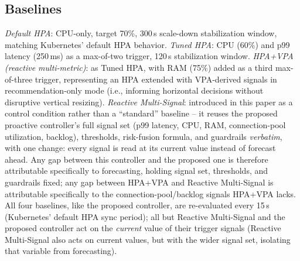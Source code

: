 \documentclass[conference]{IEEEtran}
\begin{document}
\subsection{Baselines}
\emph{Default HPA}: CPU-only, target 70\%, 300\,s scale-down stabilization window, matching Kubernetes'
default HPA behavior. \emph{Tuned HPA}: CPU (60\%) and p99 latency (250\,ms) as a max-of-two trigger,
120\,s stabilization window. \emph{HPA+VPA (reactive multi-metric)}: as Tuned HPA, with RAM (75\%)
added as a third max-of-three trigger, representing an HPA extended with VPA-derived signals in
recommendation-only mode (i.e., informing horizontal decisions without disruptive vertical resizing).
\emph{Reactive Multi-Signal}: introduced in this paper as a control condition rather than a
``standard'' baseline -- it reuses the proposed proactive controller's full signal set (p99 latency,
CPU, RAM, connection-pool utilization, backlog), thresholds, risk-fusion formula, and guardrails
\emph{verbatim}, with one change: every signal is read at its current value instead of forecast ahead.
Any gap between this controller and the proposed one is therefore attributable specifically to
forecasting, holding signal set, thresholds, and guardrails fixed; any gap between HPA+VPA and Reactive
Multi-Signal is attributable specifically to the connection-pool/backlog signals HPA+VPA lacks. All
four baselines, like the proposed controller, are re-evaluated every 15\,s (Kubernetes' default HPA
sync period); all but Reactive Multi-Signal and the proposed controller act on the \emph{current} value
of their trigger signals (Reactive Multi-Signal also acts on current values, but with the wider signal
set, isolating that variable from forecasting).
\end{document}

